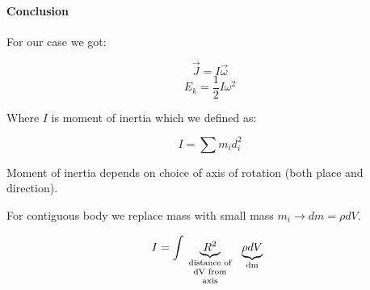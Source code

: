 \paragraph{Conclusion} For our case we got:

$$\vec{J} = I\vec{\omega}$$
$$E_k = \frac{1}{2} I \omega^2$$

Where $I$ is moment of inertia which we defined as:

$$I = \sum m_i d_i^2$$

Moment of inertia depends on choice of axis of rotation (both place and direction).

For contiguous body we replace mass with small mass $m_i \to dm = \rho dV$.

$$I = \int \underbrace{R^2}_{\parbox{1.5cm}{\centering \scriptsize distance of dV from axis}} \underbrace{\rho dV}_{\parbox{1cm}{\centering \scriptsize dm}} $$